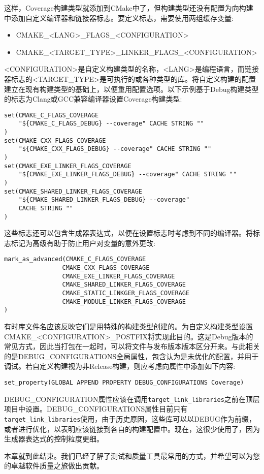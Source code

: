 这样，Coverage构建类型就添加到CMake中了，但构建类型还没有配置为向构建中添加自定义编译器和链接器标志。要定义标志，需要使用两组缓存变量:

\begin{itemize}
\item 
CMAKE\_<LANG>\_FLAGS\_<CONFIGURATION>

\item 
CMAKE\_<TARGET\_TYPE>\_LINKER\_FLAGS\_<CONFIGURATION>
\end{itemize}

<CONFIGURATION>是自定义构建类型的名称，<LANG>是编程语言，而链接器标志的<TARGET\_TYPE>是可执行的或各种类型的库。将自定义构建的配置建立在现有构建类型的基础上，以便重用配置选项。以下示例基于Debug构建类型的标志为Clang或GCC兼容编译器设置Coverage构建类型:

\begin{lstlisting}[style=styleCMake]
set(CMAKE_C_FLAGS_COVERAGE
	"${CMAKE_C_FLAGS_DEBUG} --coverage" CACHE STRING ""
)
set(CMAKE_CXX_FLAGS_COVERAGE
	"${CMAKE_CXX_FLAGS_DEBUG} --coverage" CACHE STRING ""
)
set(CMAKE_EXE_LINKER_FLAGS_COVERAGE
	"${CMAKE_EXE_LINKER_FLAGS_DEBUG} --coverage" CACHE STRING ""
)
set(CMAKE_SHARED_LINKER_FLAGS_COVERAGE
	"${CMAKE_SHARED_LINKER_FLAGS_DEBUG} --coverage"
	CACHE STRING ""
)
\end{lstlisting}

这些标志还可以包含生成器表达式，以便在设置标志时考虑到不同的编译器。将标志标记为高级有助于防止用户对变量的意外更改:

\begin{lstlisting}[style=styleCMake]
mark_as_advanced(CMAKE_C_FLAGS_COVERAGE
				CMAKE_CXX_FLAGS_COVERAGE
				CMAKE_EXE_LINKER_FLAGS_COVERAGE
				CMAKE_SHARED_LINKER_FLAGS_COVERAGE
				CMAKE_STATIC_LINKGER_FLAGS_COVERAGE
				CMAKE_MODULE_LINKER_FLAGS_COVERAGE
)
\end{lstlisting}

有时库文件名应该反映它们是用特殊的构建类型创建的。为自定义构建类型设置CMAKE\_<CONFIGURATION>\_POSTFIX将实现此目的。这是Debug版本的常见方式，因此当打包在一起时，可以将文件与发布版本版本区分开来。与此相关的是DEBUG\_CONFIGURATIONS全局属性，包含认为是未优化的配置，并用于调试。若自定义构建视为非Release构建，则应考虑向属性中添加如下内容:

\begin{lstlisting}[style=styleCMake]
set_property(GLOBAL APPEND PROPERTY DEBUG_CONFIGURATIONS Coverage)
\end{lstlisting}

DEBUG\_CONFIGURATION属性应该在调用\texttt{target\_link\_libraries}之前在顶层项目中设置。DEBUG\_CONFIGURATIONS属性目前只有\texttt{target\_link\_libraries}使用，由于历史原因，这些库可以以DEBUG作为前缀，或者进行优化，以表明应该链接到各自的构建配置中。现在，这很少使用了，因为生成器表达式的控制粒度更细。

本章就到此结束。我们已经了解了测试和质量工具最常用的方式，并希望可以为您的卓越软件质量之旅做出贡献。













